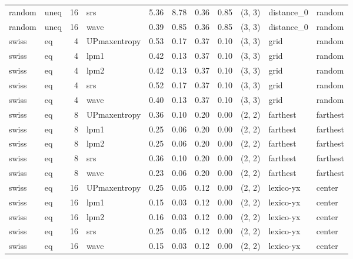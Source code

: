 \begin{tabular}{llrlrrrrlll}
random &  uneq & 16 &          srs &  5.36 &     8.78 &   0.36 &       0.85 & (3, 3) &  distance_0 &     random \\
random &  uneq & 16 &         wave &  0.39 &     0.85 &   0.36 &       0.85 & (3, 3) &  distance_0 &     random \\
 swiss &    eq &  4 & UPmaxentropy &  0.53 &     0.17 &   0.37 &       0.10 & (3, 3) &        grid &     random \\
 swiss &    eq &  4 &         lpm1 &  0.42 &     0.13 &   0.37 &       0.10 & (3, 3) &        grid &     random \\
 swiss &    eq &  4 &         lpm2 &  0.42 &     0.13 &   0.37 &       0.10 & (3, 3) &        grid &     random \\
 swiss &    eq &  4 &          srs &  0.52 &     0.17 &   0.37 &       0.10 & (3, 3) &        grid &     random \\
 swiss &    eq &  4 &         wave &  0.40 &     0.13 &   0.37 &       0.10 & (3, 3) &        grid &     random \\
 swiss &    eq &  8 & UPmaxentropy &  0.36 &     0.10 &   0.20 &       0.00 & (2, 2) &    farthest &   farthest \\
 swiss &    eq &  8 &         lpm1 &  0.25 &     0.06 &   0.20 &       0.00 & (2, 2) &    farthest &   farthest \\
 swiss &    eq &  8 &         lpm2 &  0.25 &     0.06 &   0.20 &       0.00 & (2, 2) &    farthest &   farthest \\
 swiss &    eq &  8 &          srs &  0.36 &     0.10 &   0.20 &       0.00 & (2, 2) &    farthest &   farthest \\
 swiss &    eq &  8 &         wave &  0.23 &     0.06 &   0.20 &       0.00 & (2, 2) &    farthest &   farthest \\
 swiss &    eq & 16 & UPmaxentropy &  0.25 &     0.05 &   0.12 &       0.00 & (2, 2) &   lexico-yx &     center \\
 swiss &    eq & 16 &         lpm1 &  0.15 &     0.03 &   0.12 &       0.00 & (2, 2) &   lexico-yx &     center \\
 swiss &    eq & 16 &         lpm2 &  0.16 &     0.03 &   0.12 &       0.00 & (2, 2) &   lexico-yx &     center \\
 swiss &    eq & 16 &          srs &  0.25 &     0.05 &   0.12 &       0.00 & (2, 2) &   lexico-yx &     center \\
 swiss &    eq & 16 &         wave &  0.15 &     0.03 &   0.12 &       0.00 & (2, 2) &   lexico-yx &     center \\

\end{tabular}
